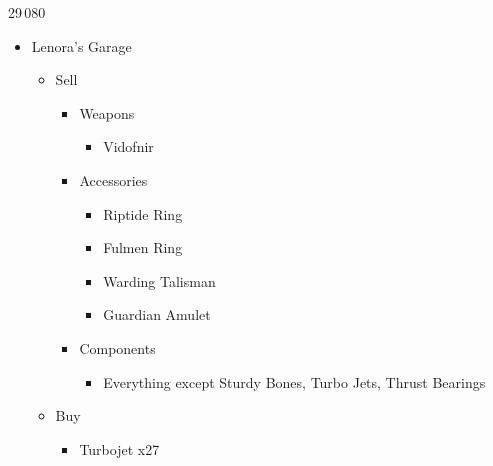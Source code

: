 \begin{paracol}{2}

	\switchcolumn


	 


	\switchcolumn*
	\begin{shop}{29\,080}
		\begin{itemize}
			\item Lenora's Garage
			      \begin{itemize}
				      \item Sell
				            \begin{itemize}
					            \item Weapons
					                  \begin{itemize}
						                  \item Vidofnir
					                  \end{itemize}
					            \item Accessories
					                  \begin{itemize}
						                  \item Riptide Ring
						                  \item Fulmen Ring
						                  \item Warding Talisman
						                  \item Guardian Amulet
					                  \end{itemize}
					            \item Components
					                  \begin{itemize}
						                  \item Everything except Sturdy Bones, Turbo Jets, Thrust Bearings
					                  \end{itemize}
				            \end{itemize}
				      \item Buy
				            \begin{itemize}
					            \item Turbojet x27
				            \end{itemize}

\end{itemize}
\end{itemize}
\end{shop}
\end{paracol}
